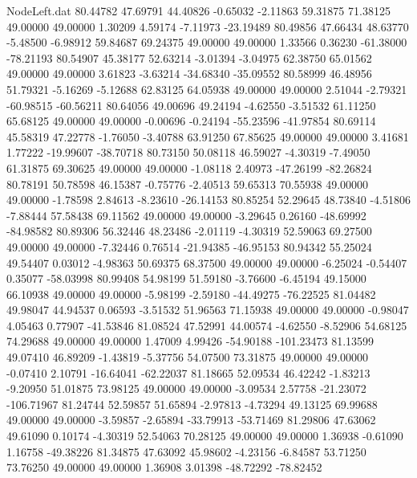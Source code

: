 \begin{filecontents}{NodeLeft.dat}
  80.44782   47.69791   44.40826    -0.65032   -2.11863   59.31875   71.38125   49.00000   49.00000    1.30209    4.59174   -7.11973  -23.19489
  80.49856   47.66434   48.63770    -5.48500   -6.98912   59.84687   69.24375   49.00000   49.00000    1.33566    0.36230  -61.38000  -78.21193
  80.54907   45.38177   52.63214    -3.01394   -3.04975   62.38750   65.01562   49.00000   49.00000    3.61823   -3.63214  -34.68340  -35.09552
  80.58999   46.48956   51.79321    -5.16269   -5.12688   62.83125   64.05938   49.00000   49.00000    2.51044   -2.79321  -60.98515  -60.56211
  80.64056   49.00696   49.24194    -4.62550   -3.51532   61.11250   65.68125   49.00000   49.00000   -0.00696   -0.24194  -55.23596  -41.97854
  80.69114   45.58319   47.22778    -1.76050   -3.40788   63.91250   67.85625   49.00000   49.00000    3.41681    1.77222  -19.99607  -38.70718
  80.73150   50.08118   46.59027    -4.30319   -7.49050   61.31875   69.30625   49.00000   49.00000   -1.08118    2.40973  -47.26199  -82.26824
  80.78191   50.78598   46.15387    -0.75776   -2.40513   59.65313   70.55938   49.00000   49.00000   -1.78598    2.84613   -8.23610  -26.14153
  80.85254   52.29645   48.73840    -4.51806   -7.88444   57.58438   69.11562   49.00000   49.00000   -3.29645    0.26160  -48.69992  -84.98582
  80.89306   56.32446   48.23486    -2.01119   -4.30319   52.59063   69.27500   49.00000   49.00000   -7.32446    0.76514  -21.94385  -46.95153
  80.94342   55.25024   49.54407     0.03012   -4.98363   50.69375   68.37500   49.00000   49.00000   -6.25024   -0.54407    0.35077  -58.03998
  80.99408   54.98199   51.59180    -3.76600   -6.45194   49.15000   66.10938   49.00000   49.00000   -5.98199   -2.59180  -44.49275  -76.22525
  81.04482   49.98047   44.94537     0.06593   -3.51532   51.96563   71.15938   49.00000   49.00000   -0.98047    4.05463    0.77907  -41.53846
  81.08524   47.52991   44.00574    -4.62550   -8.52906   54.68125   74.29688   49.00000   49.00000    1.47009    4.99426  -54.90188 -101.23473
  81.13599   49.07410   46.89209    -1.43819   -5.37756   54.07500   73.31875   49.00000   49.00000   -0.07410    2.10791  -16.64041  -62.22037
  81.18665   52.09534   46.42242    -1.83213   -9.20950   51.01875   73.98125   49.00000   49.00000   -3.09534    2.57758  -21.23072 -106.71967
  81.24744   52.59857   51.65894    -2.97813   -4.73294   49.13125   69.99688   49.00000   49.00000   -3.59857   -2.65894  -33.79913  -53.71469
  81.29806   47.63062   49.61090     0.10174   -4.30319   52.54063   70.28125   49.00000   49.00000    1.36938   -0.61090    1.16758  -49.38226
  81.34875   47.63092   45.98602    -4.23156   -6.84587   53.71250   73.76250   49.00000   49.00000    1.36908    3.01398  -48.72292  -78.82452

\end{filecontents}
